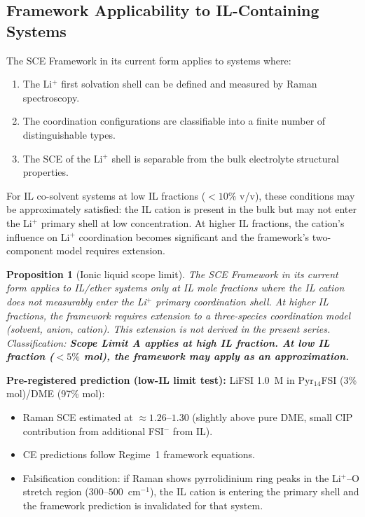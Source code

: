 \documentclass[11pt]{article}
\theoremstyle{plain}
\newtheorem{proposition}[theorem]{Proposition}
\theoremstyle{definition}
\theoremstyle{remark}
\begin{document}
\subsection{Framework Applicability to IL-Containing Systems}

The SCE Framework in its current form applies to systems where:
\begin{enumerate}[leftmargin=2em]
  \item The Li$^+$ first solvation shell can be defined and
        measured by Raman spectroscopy.
  \item The coordination configurations are classifiable into
        a finite number of distinguishable types.
  \item The SCE of the Li$^+$ shell is separable from the
        bulk electrolyte structural properties.
\end{enumerate}

For IL co-solvent systems at low IL fractions ($< 10\%$ v/v),
these conditions may be approximately satisfied: the IL cation
is present in the bulk but may not enter the Li$^+$ primary
shell at low concentration.  At higher IL fractions, the
cation's influence on Li$^+$ coordination becomes significant
and the framework's two-component model requires extension.

\begin{proposition}[Ionic liquid scope limit]
The SCE Framework in its current form applies to IL/ether
systems only at IL mole fractions where the IL cation does
not measurably enter the Li$^+$ primary coordination shell.
At higher IL fractions, the framework requires extension to
a three-species coordination model (solvent, anion, cation).
This extension is not derived in the present series.
Classification: \textbf{Scope Limit A applies at high IL fraction.
At low IL fraction ($< 5\%$ mol), the framework may apply as
an approximation.}
\end{proposition}

\textbf{Pre-registered prediction (low-IL limit test):}
LiFSI 1.0~M in Pyr$_{14}$FSI (3\% mol)/DME (97\% mol):
\begin{itemize}[leftmargin=2em]
  \item Raman SCE estimated at $\approx 1.26$--$1.30$
        (slightly above pure DME, small CIP contribution
        from additional FSI$^-$ from IL).
  \item CE predictions follow Regime~1 framework equations.
  \item Falsification condition: if Raman shows pyrrolidinium
        ring peaks in the Li$^+$--O stretch region
        ($300$--$500$~cm$^{-1}$), the IL cation is entering
        the primary shell and the framework prediction is
        invalidated for that system.
\end{itemize}
\end{document}
